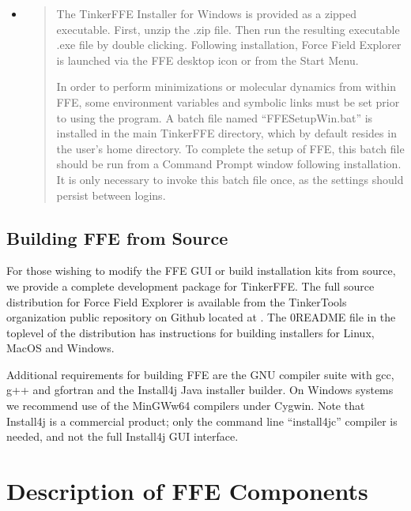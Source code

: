 \documentclass[letterpaper,11pt,english]{sphinxmanual}
\begin{document}
\begin{itemize}
\item {} 
\sphinxAtStartPar
{}
\begin{quote}

\sphinxAtStartPar
The Tinker\sphinxhyphen{}FFE Installer for Windows is provided as a zipped executable. First, unzip the .zip file. Then run the resulting executable .exe file by double clicking. Following installation, Force Field Explorer is launched via the FFE desktop icon or from the Start Menu.

\sphinxAtStartPar
In order to perform minimizations or molecular dynamics from within FFE, some environment variables and symbolic links must be set prior to using the program. A batch file named “FFESetupWin.bat” is installed in the main Tinker\sphinxhyphen{}FFE directory, which by default resides in the user’s home directory. To complete the setup of FFE, this batch file should be run from a Command Prompt window following installation. It is only necessary to invoke this batch file once, as the settings should persist between logins.
\end{quote}

\end{itemize}


\section{Building FFE from Source}
\label{\detokenize{text/installation:building-ffe-from-source}}
\sphinxAtStartPar
For those wishing to modify the FFE GUI or build installation kits from source, we provide a complete development package for Tinker\sphinxhyphen{}FFE. The full source distribution for Force Field Explorer is available from the TinkerTools organization public repository on Github located at . The 0README file in the top\sphinxhyphen{}level of the distribution has instructions for building installers for Linux, MacOS and Windows.

\sphinxAtStartPar
Additional requirements for building FFE are the GNU compiler suite with gcc, g++ and gfortran and the Install4j Java installer builder. On Windows systems we recommend use of the MinGW\sphinxhyphen{}w64 compilers under Cygwin. Note that Install4j is a commercial product; only the command line “install4jc” compiler is needed, and not the full Install4j GUI interface.

\sphinxstepscope


\chapter{Description of FFE Components}
\label{\detokenize{text/components:description-of-ffe-components}}\label{\detokenize{text/components::doc}}
\end{document}

